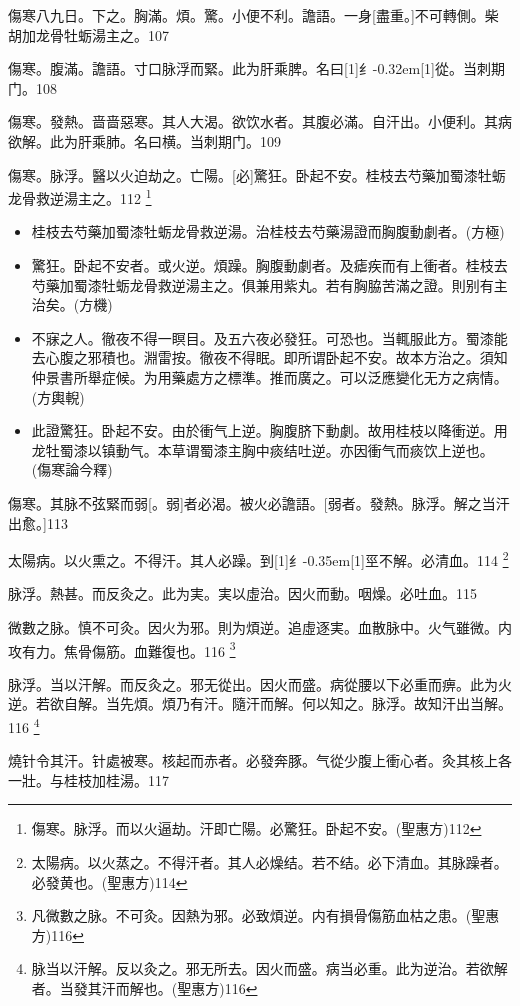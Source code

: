 \documentclass[11pt,oneside,b5paper]{ctexbook}
\begin{document}
\begin{flushleft}
傷寒八九日。下之。胸滿。煩。驚。小便不利。譫語。一身[盡重。]不可轉側。柴胡加龙骨牡蛎湯主之。107

傷寒。腹滿。譫語。寸口脉浮而緊。此为肝乘脾。名曰{\hbox{\scalebox{0.6}[1]{纟}\kern-0.32em\scalebox{0.7}[1]{從}}}。当刺期门。108

傷寒。發熱。啬啬惡寒。其人大渴。欲饮水者。其腹必滿。自汗出。小便利。其病欲解。此为肝乘肺。名曰横。当刺期门。109

傷寒。脉浮。醫以火迫劫之。亡陽。[必]驚狂。卧起不安。桂枝去芍藥加蜀漆牡蛎龙骨救逆湯主之。112
\footnote{傷寒。脉浮。而以火逼劫。汗即亡陽。必驚狂。卧起不安。(聖惠方)112}
\begin{itemize}
\item 桂枝去芍藥加蜀漆牡蛎龙骨救逆湯。治桂枝去芍藥湯證而胸腹動劇者。(方極)
\item 驚狂。卧起不安者。或火逆。煩躁。胸腹動劇者。及瘧疾而有上衝者。桂枝去芍藥加蜀漆牡蛎龙骨救逆湯主之。俱兼用紫丸。若有胸脇苦滿之證。則别有主治矣。(方機)
\item 不寐之人。徹夜不得一瞑目。及五六夜必發狂。可恐也。当輒服此方。蜀漆能去心腹之邪積也。淵雷按。徹夜不得眠。即所谓卧起不安。故本方治之。須知仲景書所舉症候。为用藥處方之標準。推而廣之。可以泛應變化无方之病情。(方輿輗)
\item 此證驚狂。卧起不安。由於衝气上逆。胸腹脐下動劇。故用桂枝以降衝逆。用龙牡蜀漆以镇動气。本草谓蜀漆主胸中痰结吐逆。亦因衝气而痰饮上逆也。(傷寒論今釋)
\end{itemize}

傷寒。其脉不弦緊而弱[。弱]者必渴。被火必譫語。[弱者。發熱。脉浮。解之当汗出愈。]113

太陽病。以火熏之。不得汗。其人必躁。到{\hbox{\scalebox{0.68}[1]{纟}\kern-0.35em\scalebox{0.64}[1]{巠}}}不解。必清血。114
\footnote{太陽病。以火蒸之。不得汗者。其人必燥结。若不结。必下清血。其脉躁者。必發黄也。(聖惠方)114}

脉浮。熱甚。而反灸之。此为実。実以虛治。因火而動。咽燥。必吐血。115　

微數之脉。慎不可灸。因火为邪。則为煩逆。追虛逐実。血散脉中。火气雖微。内攻有力。焦骨傷筋。血難復也。116
\footnote{凡微數之脉。不可灸。因熱为邪。必致煩逆。内有損骨傷筋血枯之患。(聖惠方)116}

脉浮。当以汗解。而反灸之。邪无從出。因火而盛。病從腰以下必重而痹。此为火逆。若欲自解。当先煩。煩乃有汗。隨汗而解。何以知之。脉浮。故知汗出当解。116
\footnote{脉当以汗解。反以灸之。邪无所去。因火而盛。病当必重。此为逆治。若欲解者。当發其汗而解也。(聖惠方)116}

燒针令其汗。针處被寒。核起而赤者。必發奔豚。气從少腹上衝心者。灸其核上各一壯。与桂枝加桂湯。117


\end{flushleft}
\end{document}
